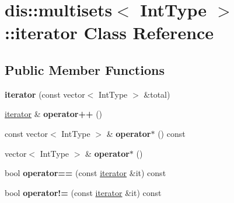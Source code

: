 \hypertarget{classdis_1_1multisets_1_1iterator}{\section{dis\-:\-:multisets$<$ Int\-Type $>$\-:\-:iterator Class Reference}
\label{classdis_1_1multisets_1_1iterator}
}
\subsection*{Public Member Functions}
\begin{DoxyCompactItemize}
\item 
\hypertarget{classdis_1_1multisets_1_1iterator_a65e08ad1e9a9777d2da855fb9c6edfbd}{{\bfseries iterator} (const vector$<$ Int\-Type $>$ \&total)}\label{classdis_1_1multisets_1_1iterator_a65e08ad1e9a9777d2da855fb9c6edfbd}

\item 
\hypertarget{classdis_1_1multisets_1_1iterator_a69326a4db582ae4d76194ef5cd13cab7}{\hyperlink{classdis_1_1multisets_1_1iterator}{iterator} \& {\bfseries operator++} ()}\label{classdis_1_1multisets_1_1iterator_a69326a4db582ae4d76194ef5cd13cab7}

\item 
\hypertarget{classdis_1_1multisets_1_1iterator_a177786c7f24468c0e2d44cc75290beea}{const vector$<$ Int\-Type $>$ \& {\bfseries operator$\ast$} () const }\label{classdis_1_1multisets_1_1iterator_a177786c7f24468c0e2d44cc75290beea}

\item 
\hypertarget{classdis_1_1multisets_1_1iterator_a7bd9a66b0ffc2f2b3bf903e004fe471c}{vector$<$ Int\-Type $>$ \& {\bfseries operator$\ast$} ()}\label{classdis_1_1multisets_1_1iterator_a7bd9a66b0ffc2f2b3bf903e004fe471c}

\item 
\hypertarget{classdis_1_1multisets_1_1iterator_a0599b6c107f6416f278bae5fc9a7eb5b}{bool {\bfseries operator==} (const \hyperlink{classdis_1_1multisets_1_1iterator}{iterator} \&it) const }\label{classdis_1_1multisets_1_1iterator_a0599b6c107f6416f278bae5fc9a7eb5b}

\item 
\hypertarget{classdis_1_1multisets_1_1iterator_ad045d52726c8ecc0ef970b8bd1ec4ee4}{bool {\bfseries operator!=} (const \hyperlink{classdis_1_1multisets_1_1iterator}{iterator} \&it) const }\label{classdis_1_1multisets_1_1iterator_ad045d52726c8ecc0ef970b8bd1ec4ee4}

\end{DoxyCompactItemize}
